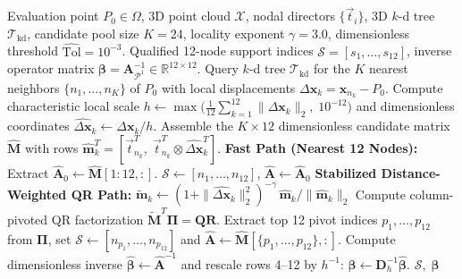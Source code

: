 \documentclass[preprint,12pt]{elsarticle}
\newcommand{\R}{\mathbb{R}}
\begin{document}
\begin{algorithm}[htbp]
\caption{Scale-Invariant 3D Support Selection via Distance-Weighted Column-Pivoted QR}
\label{alg:support_selection_3d}
\footnotesize
\begin{algorithmic}[1]
\Require Evaluation point $P_0 \in \Omega$, 3D point cloud $\mathcal{X}$, nodal directors $\{\vec{t}_i\}$, 3D $k$-d tree $\mathcal{T}_{\text{kd}}$, candidate pool size $K = 24$, locality exponent $\gamma = 3.0$, dimensionless threshold $\widehat{\text{Tol}} = 10^{-3}$.
\Ensure Qualified 12-node support indices $\mathcal{S} = [s_1, \dots, s_{12}]$, inverse operator matrix $\bm{\beta} = \mathbf{A}_{\mathcal{P}^1}^{-1} \in \R^{12\times 12}$.
\State Query $k$-d tree $\mathcal{T}_{\text{kd}}$ for the $K$ nearest neighbors $\{n_1, \dots, n_K\}$ of $P_0$ with local displacements $\Delta\mathbf{x}_k = \mathbf{x}_{n_k} - P_0$.
\State Compute characteristic local scale $h \gets \max\big(\frac{1}{12}\sum_{k=1}^{12} \|\Delta\mathbf{x}_k\|_2, \; 10^{-12}\big)$ and dimensionless coordinates $\widehat{\Delta\mathbf{x}}_k \gets \Delta\mathbf{x}_k / h$.
\State Assemble the $K \times 12$ dimensionless candidate matrix $\widehat{\mathbf{M}}$ with rows $\widehat{\mathbf{m}}_k^T = [\vec{t}_{n_k}^T, \; \vec{t}_{n_k}^T \otimes \widehat{\Delta\mathbf{x}}_k^T]$.
\State \textbf{Fast Path (Nearest 12 Nodes):} Extract $\widehat{\mathbf{A}}_0 \gets \widehat{\mathbf{M}}[1\!:\!12, :]$.
    \State $\mathcal{S} \gets [n_1, \dots, n_{12}]$, \quad $\widehat{\mathbf{A}} \gets \widehat{\mathbf{A}}_0$
\Else
    \State \textbf{Stabilized Distance-Weighted QR Path:}
        \State $\widetilde{\mathbf{m}}_k \gets (1 + \|\widehat{\Delta\mathbf{x}}_k\|_2^2)^{-\gamma} \, \widehat{\mathbf{m}}_k / \|\widehat{\mathbf{m}}_k\|_2$
    \EndFor
    \State Compute column-pivoted QR factorization $\widetilde{\mathbf{M}}^T \bm{\Pi} = \mathbf{Q}\mathbf{R}$.
    \State Extract top 12 pivot indices $p_1, \dots, p_{12}$ from $\bm{\Pi}$, set $\mathcal{S} \gets [n_{p_1}, \dots, n_{p_{12}}]$ and $\widehat{\mathbf{A}} \gets \widehat{\mathbf{M}}[\{p_1,\dots,p_{12}\}, :]$.
\EndIf
\State Compute dimensionless inverse $\widehat{\bm{\beta}} \gets \widehat{\mathbf{A}}^{-1}$ and rescale rows 4--12 by $h^{-1}$: $\bm{\beta} \gets \mathbf{D}_h^{-1}\widehat{\bm{\beta}}$.
\State \Return $\mathcal{S}, \; \bm{\beta}$
\end{algorithmic}
\end{algorithm}
\end{document}
